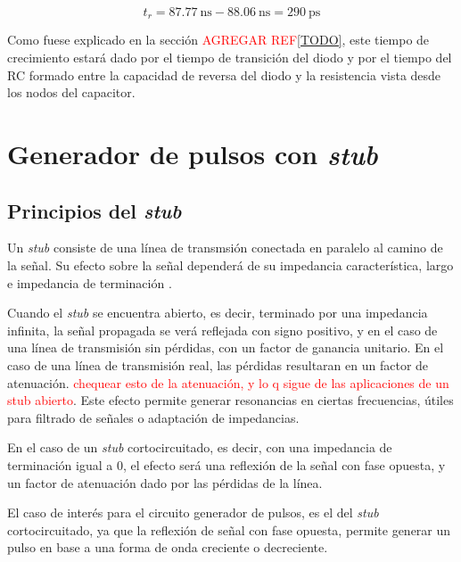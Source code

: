 \begin{equation}
    t_r = \qty{87.77}{\nano\second} - \qty{88.06}{\nano\second} =
    \qty{290}{\pico\second}
\end{equation}

Como fuese explicado en la sección \textcolor{red}{AGREGAR REF\ref{TODO}}, este
tiempo de crecimiento estará dado por el tiempo de transición del diodo y por el
tiempo del RC formado entre la capacidad de reversa del diodo y la resistencia
vista desde los nodos del capacitor.

\section{Generador de pulsos con \textit{stub}}
\label{sec:generador_pulsos_stub}

\subsection{Principios del \textit{stub}}

Un \textit{stub} consiste de una línea de transmsión conectada en paralelo al
camino de la señal. Su efecto sobre la señal dependerá de su impedancia
característica, largo e impedancia de terminación \cite{pozar2011}.

Cuando el \textit{stub} se encuentra abierto, es decir, terminado por una
impedancia infinita, la señal propagada se verá reflejada con signo positivo, y
en el caso de una línea de transmisión sin pérdidas, con un factor de ganancia
unitario. En el caso de una línea de transmisión real, las pérdidas resultaran
en un factor de atenuación. \textcolor{red}{chequear esto de la atenuación, y lo
q sigue de las aplicaciones de un stub abierto}.  Este efecto permite generar
resonancias en ciertas frecuencias, útiles para filtrado de señales o adaptación
de impedancias.

En el caso de un \textit{stub} cortocircuitado, es decir, con una impedancia de
terminación igual a $0$, el efecto será una reflexión de la señal con fase
opuesta, y un factor de atenuación dado por las pérdidas de la línea.

El caso de interés para el circuito generador de pulsos, es el del \textit{stub}
cortocircuitado, ya que la reflexión de señal con fase opuesta, permite generar
un pulso en base a una forma de onda creciente o decreciente.

